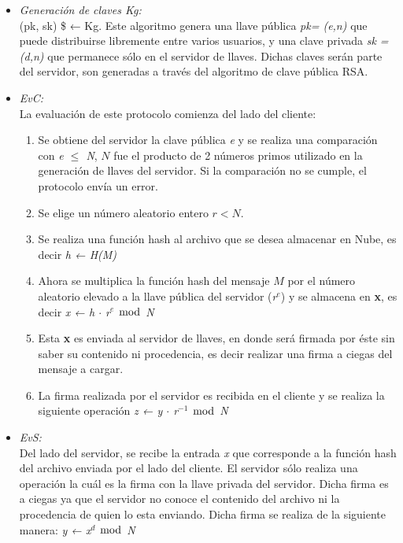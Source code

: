 \begin{itemize}
\item \textit{Generación de claves Kg: } \\
(pk, sk) \$ ← Kg. Este algoritmo genera una llave pública \textit{pk= (e,n)} que puede distribuirse libremente entre varios usuarios, y una clave privada \textit{sk = (d,n)} que permanece sólo en el servidor de llaves. Dichas claves serán parte del servidor, son generadas a través del algoritmo de clave pública RSA.


\item \textit{EvC: }\\ 
La evaluación de este protocolo comienza del lado del cliente: 
\begin {enumerate}
\item Se obtiene del servidor la clave pública \textit{e} y se realiza una comparación con \textit{e $\leq$ N}, $N$ fue el producto de 2 números primos utilizado en la generación de llaves del servidor. Si la comparación no se cumple, el protocolo envía un error.
\item Se elige un número aleatorio entero $r<N$.
\item Se realiza una función hash al archivo que se desea almacenar en Nube, es decir \textit{h ← H(M)} 
\item Ahora se multiplica la función hash del mensaje $M$ por el número aleatorio elevado a la llave pública del servidor (\textit{r$^e$}) y se almacena en \textbf{x}, es decir \textit{x ← h $\cdot$ r$^e$ $\bmod$ N}
\item Esta \textbf{x} es enviada al servidor de llaves, en donde será firmada por éste sin saber su contenido ni procedencia, es decir realizar una firma a ciegas del mensaje a cargar.
\item La firma realizada por el servidor es recibida en el cliente y se realiza la siguiente operación \hspace{2cm} \textit{z ← y $\cdot$ r$^{-1}$ $\bmod$ N}


\end{enumerate}
\item \textit{EvS: }\\ 
Del lado del servidor, se recibe la entrada \textit{x} que corresponde a la función hash del archivo enviada por el lado del cliente. El servidor sólo realiza una operación la cuál es la firma con la llave privada del servidor. Dicha firma es a ciegas ya que el servidor no conoce el contenido del archivo ni la procedencia de quien lo esta enviando. Dicha firma se realiza de la siguiente manera: \hspace{2cm} \textit{y ← x$^d$ $\bmod$ N}



\end{itemize}
